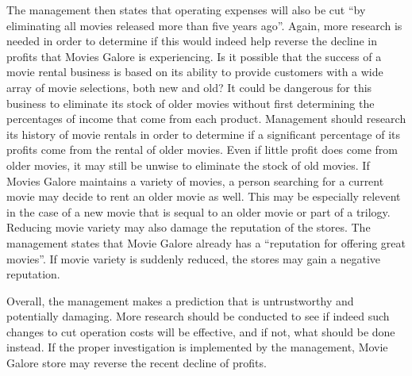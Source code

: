 The management then states that operating expenses will also be cut ``by eliminating all movies released more than five years ago''.
Again, more research is needed in order to determine if this would indeed help reverse the decline in profits that Movies Galore is experiencing.
Is it possible that the success of a movie rental business is based on its ability to provide customers with a wide array of movie selections, both new and old?
It could be dangerous for this business to eliminate its stock of older movies without first determining the percentages of income that come from each product.
Management should research its history of movie rentals in order to determine if a significant percentage of its profits come from the rental of older movies.
Even if little profit does come from older movies, it may still be unwise to eliminate the stock of old movies.
If Movies Galore maintains a variety of movies, a person searching for a current movie may decide to rent an older movie as well.
This may be especially relevent in the case of a new movie that is sequal to an older movie or part of a trilogy.
Reducing movie variety may also damage the reputation of the stores.
The management states that Movie Galore already has a ``reputation for offering great movies''.
If movie variety is suddenly reduced, the stores may gain a negative reputation.

Overall, the management makes a prediction that is untrustworthy and potentially damaging.
More research should be conducted to see if indeed such changes to cut operation costs will be effective, and if not, what should be done instead.
If the proper investigation is implemented by the management, Movie Galore store may reverse the recent decline of profits.